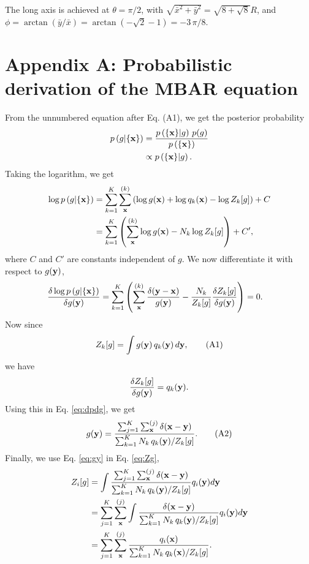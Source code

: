 \documentclass[aip,jcp,preprint,notitlepage, superscriptaddress]{revtex4-1}
\begin{document}
The long axis is achieved at $\theta = \pi/2$,
with
$\sqrt{ {\bar x}^2 + {\bar y}^2 } = \sqrt{ 8 + \sqrt 8 } R$,
and
$\phi = \arctan(\bar y/\bar x) = \arctan \left(-\sqrt 2 - 1\right) = -3 \, \pi/8$.




\section{Appendix A: Probabilistic derivation of the MBAR equation}



From the unnumbered equation after Eq. (A1),
we get the posterior probability
\begin{align*}
p\left( g | \{ \mathbf{x} \} \right)
&=
\frac{
  p\left( \{ \mathbf{x} \} | g \right) \, p(g)
}
{
  p\left( \{ \mathbf{x} \} \right)
}
\\
&\propto
p\left( \{ \mathbf{x} \} | g \right).
\end{align*}
%
Taking the logarithm, we get
%
\begin{align*}
\log p\left( g | \{ \mathbf{x} \} \right)
&=
\sum_{k = 1}^K
  \sum_{\mathbf{x}}^{(k)}
    \left(
      \log g(\mathbf{x}) + \log q_k(\mathbf{x}) - \log Z_k[g]
    \right)
+ C
\\
&=
\sum_{k = 1}^K
\left(
  \sum_{\mathbf{x}}^{(k)}
    \log g(\mathbf{x}) - N_k \log Z_k[g]
\right) + C',
\end{align*}
%
where $C$ and $C'$
are constants independent of $g$.
%
We now differentiate it with respect to $g(\mathbf{y})$,
%
\begin{align}
\frac{
  \delta \log p\left( g | \{ \mathbf{x} \} \right)
}
{
  \delta g(\mathbf{y})
}
&=
\sum_{k = 1}^K
\left(
  \sum_{\mathbf{x}}^{(k)}
  \frac{ \delta( \mathbf{y} - \mathbf{x} ) }
  { g(\mathbf{y}) }
  -
  \frac {N_k} { Z_k[g] }
  \frac{ \delta Z_k[g] } { \delta g(\mathbf{y}) }
\right)
= 0.
\label{eq:dpdg}
\end{align}
%
Now since
\begin{equation}
Z_k[g]
=
\int g(\mathbf{y}) \, q_k(\mathbf{y}) \, d\mathbf{y},
\tag{A1}
\label{eq:Zg}
\end{equation}
we have
\begin{equation*}
\frac{ \delta Z_k[g] } { \delta g(\mathbf{y}) }
= q_k(\mathbf{y}).
\end{equation*}
%
Using this in Eq. \eqref{eq:dpdg},
we get
\begin{equation}
g(\mathbf{y})
=
\frac{
  \sum_{j = 1}^K \sum_{\mathbf{x}}^{(j)} \delta(\mathbf{x} - \mathbf{y})
}
{
  \sum_{k = 1}^K N_k \, q_k(\mathbf{y}) / Z_k[g]
}.
\tag{A2}
\label{eq:gy}
\end{equation}
%
Finally,
we use Eq. \eqref{eq:gy} in Eq. \eqref{eq:Zg},
%
\begin{align}
Z_i[g]
&=
\int
\frac{
  \sum_{j = 1}^K \sum_{\mathbf{x}}^{(j)} \delta(\mathbf{x} - \mathbf{y})
}
{
  \sum_{k = 1}^K N_k \, q_k(\mathbf{y}) / Z_k[g]
}
q_i(\mathbf{y}) d\mathbf{y}
\notag \\
&=
\sum_{j = 1}^K \sum_{\mathbf{x}}^{(j)}
\int
\frac{
  \delta(\mathbf{x} - \mathbf{y})
}
{
  \sum_{k = 1}^K N_k \, q_k(\mathbf{y}) / Z_k[g]
}
q_i(\mathbf{y}) d\mathbf{y}
\notag \\
&=
\sum_{j = 1}^K \sum_{\mathbf{x}}^{(j)}
\frac{
  q_i(\mathbf{x})
}
{
  \sum_{k = 1}^K N_k \, q_k(\mathbf{x}) / Z_k[g]
}.
\end{align}
\end{document}
